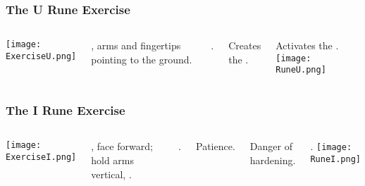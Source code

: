 

\begin{frame}
\frametitle{The U Rune Exercise}
\begin{columns}[c] %

\texttt{[image: ExerciseU.png]}

, arms and fingertips pointing to the ground.

\vspace{5mm}
. 

Creates the .

\vspace{5mm}
Activates the .
\texttt{[image: RuneU.png]}
\end{columns}

\end{frame}

\begin{frame}
\frametitle{The I Rune Exercise}
\begin{columns}[c] %

\texttt{[image: ExerciseI.png]}

, face forward; hold arms vertical, . 

\vspace{5mm}
.

Patience.

Danger of hardening.

\vspace{5mm}
.
\texttt{[image: RuneI.png]}
\end{columns}

\end{frame}


